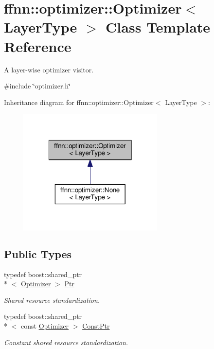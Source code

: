 \hypertarget{classffnn_1_1optimizer_1_1_optimizer}{\section{ffnn\-:\-:optimizer\-:\-:Optimizer$<$ Layer\-Type $>$ Class Template Reference}
\label{classffnn_1_1optimizer_1_1_optimizer}
}


A layer-\/wise optimizer visitor.  




{\ttfamily \#include \char`\"{}optimizer.\-h\char`\"{}}



Inheritance diagram for ffnn\-:\-:optimizer\-:\-:Optimizer$<$ Layer\-Type $>$\-:
\nopagebreak
\begin{figure}[H]
\begin{center}
\leavevmode
\includegraphics[width=206pt]{classffnn_1_1optimizer_1_1_optimizer__inherit__graph}
\end{center}
\end{figure}
\subsection*{Public Types}
\begin{DoxyCompactItemize}
\item 
typedef boost\-::shared\-\_\-ptr\\*
$<$ \hyperlink{classffnn_1_1optimizer_1_1_optimizer}{Optimizer} $>$ \hyperlink{classffnn_1_1optimizer_1_1_optimizer_ac03e7181934bf0c12a97fc67a60484ab}{Ptr}
\begin{DoxyCompactList}\small\item\em Shared resource standardization. \end{DoxyCompactList}\item 
typedef boost\-::shared\-\_\-ptr\\*
$<$ const \hyperlink{classffnn_1_1optimizer_1_1_optimizer}{Optimizer} $>$ \hyperlink{classffnn_1_1optimizer_1_1_optimizer_a5d62c55f6f830e993ffe801fb17a1c3a}{Const\-Ptr}
\begin{DoxyCompactList}\small\item\em Constant shared resource standardization. \end{DoxyCompactList}\end{DoxyCompactItemize}
